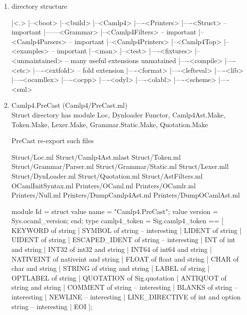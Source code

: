   \begin{enumerate}
  \item directory structure 

\begin{bluecode}
|<.>
|--<boot>
|--<build>
|--<Camlp4>
|----<Printers>
|----<Struct>       -- important
|------<Grammar> 
|--<Camlp4Filters>  -- important 
|--<Camlp4Parsers>  -- important 
|--<Camlp4Printers> 
|--<Camlp4Top>
|--<examples>       -- important
|--<man>
|--<test>
|----<fixtures>
|--<unmaintained>   -- many useful extensions unmatained
|----<compile>
|----<etc>
|----<extfold>      -- fold extension 
|----<format>
|----<lefteval>
|----<lib>
|----<ocamllex>
|----<ocpp>
|----<odyl>
|----<olabl>
|----<scheme>
|----<sml>
\end{bluecode}



  \item Camlp4.PreCast (Camlp4/PreCast.ml) \\

    Struct directory has module  Loc, Dynloader Functor,
    Camlp4Ast.Make, Token.Make, Lexer.Make, Grammar.Static.Make, Quotation.Make

    PreCast re-export such files

    \begin{bluetext}
    Struct/Loc.ml 
    Struct/Camlp4Ast.mlast 
    Struct/Token.ml 
    Struct/Grammar/Parser.ml 
    Struct/Grammar/Static.ml 
    Struct/Lexer.mll 
    Struct/DynLoader.ml 
    Struct/Quotation.ml 
    Struct/AstFilters.ml 
    OCamlInitSyntax.ml 
    Printers/OCaml.ml 
    Printers/OCamlr.ml
    Printers/Null.ml 
    Printers/DumpCamlp4Ast.ml
    Printers/DumpOCamlAst.ml 
    \end{bluetext}



\begin{bluecode}
module Id = struct
  value name = "Camlp4.PreCast";
  value version = Sys.ocaml_version;
end;
type camlp4_token = Sig.camlp4_token ==
  [ KEYWORD       of string
  | SYMBOL        of string               -- interesting 
  | LIDENT        of string
  | UIDENT        of string
  | ESCAPED_IDENT of string               -- interesting 
  | INT           of int and string
  | INT32         of int32 and string
  | INT64         of int64 and string
  | NATIVEINT     of nativeint and string
  | FLOAT         of float and string
  | CHAR          of char and string
  | STRING        of string and string
  | LABEL         of string
  | OPTLABEL      of string
  | QUOTATION     of Sig.quotation
  | ANTIQUOT      of string and string
  | COMMENT       of string               -- interesting 
  | BLANKS        of string               -- interesting  
  | NEWLINE                               -- interesting 
  | LINE_DIRECTIVE of int and option string  -- interesting 
  | EOI ];



\end{bluecode}
\end{enumerate}

